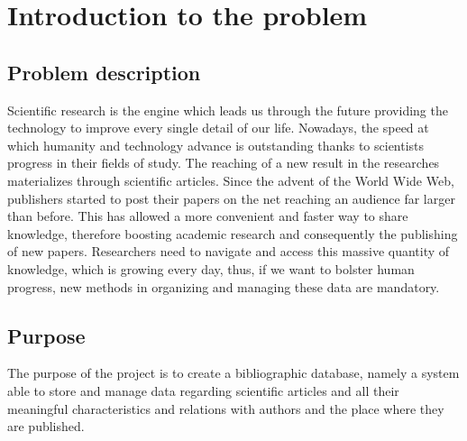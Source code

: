 \chapter{Introduction to the problem}
\label{ch:chapter_one}%


\section{Problem description}
\label{sec:section_name}%
Scientific research is the engine which leads us through the future providing the technology to improve every single detail of our life.
Nowadays, the speed at which humanity and technology advance is outstanding thanks to scientists progress in their fields of study.
The reaching of a new result in the researches materializes through scientific articles.
Since the advent of the World Wide Web, publishers started to post their papers on the net reaching an audience far larger than before.
This has allowed a more convenient and faster way to share knowledge, therefore boosting academic research and consequently the publishing of new papers.
Researchers need to navigate and access this massive quantity of knowledge, which is growing every day, thus, if we want to bolster human progress, new methods in organizing and managing these data are mandatory.


\section{Purpose}
\label{sec:purpose}%
The purpose of the project is to create a bibliographic database, namely a system able to store and manage data regarding scientific articles and all their meaningful characteristics and relations with authors and the place where they are published.


